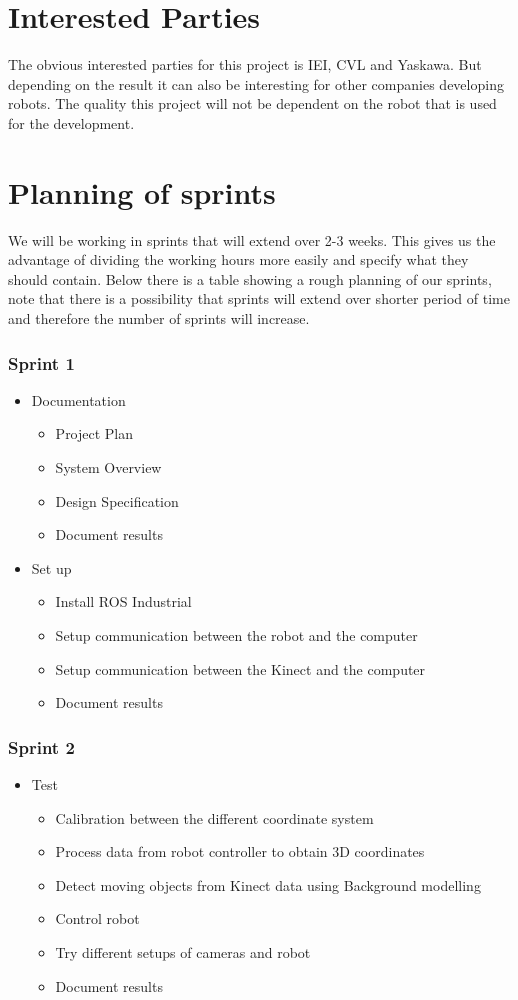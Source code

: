 \documentclass[10pt,a4paper]{article}
\begin{document}
\section{Interested Parties}
The obvious interested parties for this project is IEI, CVL and Yaskawa. But depending on the result it can also be interesting for other companies developing robots. The quality this project will not be dependent on the robot that is used for the development.  

\section{Planning of sprints}
We will be working in sprints that will extend over 2-3 weeks. This gives us the advantage of dividing the working hours more easily and specify what they should contain. Below there is a table showing a rough planning of our sprints, note that there is a possibility that sprints will extend over shorter period of time and therefore the number of sprints will increase.

\subsubsection*{Sprint 1}
\begin{itemize}
  \item Documentation
	\begin{itemize}
	\item Project Plan
	\item System Overview
	\item Design Specification
	\item Document results
	\end{itemize}
	\item Set up
	\begin{itemize}
	\item Install ROS Industrial
	\item Setup communication between the robot and the computer
	\item Setup communication between the Kinect and the computer
	\item Document results
	\end{itemize}
\end{itemize}
\subsubsection*{Sprint 2}
\begin{itemize}
\item Test
\begin{itemize}
\item Calibration between the different coordinate system
\item Process data from robot controller to obtain 3D coordinates
\item Detect moving objects from Kinect data using Background modelling
\item Control robot
\item Try different setups of cameras and robot
\item Document results
\end{itemize}
\end{itemize}
\end{document}
